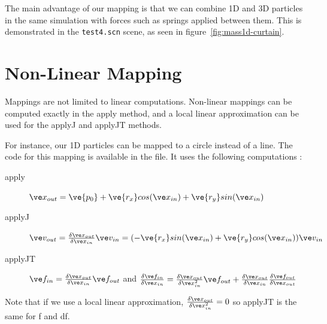 The main advantage of our mapping is that we can combine 1D and 3D particles in the same simulation with forces such as springs applied between them. This is demonstrated in the \texttt{test4.scn} scene, as seen in figure~\ref{fig:mass1d-curtain}.

\section{Non-Linear Mapping}

Mappings are not limited to linear computations. Non-linear mappings can be computed exactly in the apply method, and a local linear approximation can be used for the applyJ and applyJT methods.

For instance, our 1D particles can be mapped to a circle instead of a line. The code for this mapping is available in the
 file. It uses the following computations :

\begin{description}
\item[apply] $ \ve x_{out} = \ve{p_0} + \ve{r_x} cos( \ve x_{in} ) + \ve{r_y} sin( \ve x_{in} ) $
\item[applyJ] $ \ve v_{out} = \frac{\delta \ve x_{out}}{\delta \ve x_{in}} \ve v_{in} = ( - \ve{r_x} sin ( \ve x_{in} ) + \ve{r_y} cos ( \ve x_{in} ) ) \ve v_{in} $
\item[applyJT] $ \ve f_{in} = \frac{\delta \ve x_{out}}{\delta \ve x_{in}} \ve f_{out} $ and $ \frac{\delta \ve f_{in}}{\delta \ve x_{in}} = \frac{\delta \ve x_{out}}{\delta \ve x_{in}^2} \ve f_{out} + \frac{\delta \ve x_{out}}{\delta \ve x_{in}} \frac{\delta \ve f_{out}}{\delta \ve x_{out}} $
\end{description}

Note that if we use a local linear approximation, $ \frac{\delta \ve x_{out}}{\delta \ve x_{in}^2} = 0 $ so applyJT is the same for f and df.

